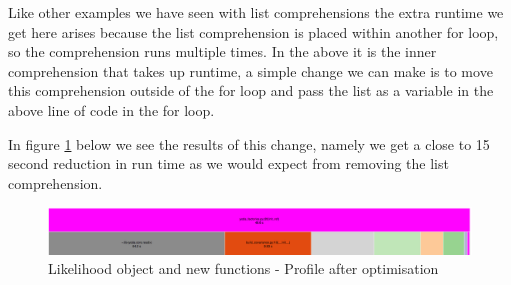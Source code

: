 Like other examples we have seen with list comprehensions the extra runtime we get here arises because the list comprehension is placed within another for loop, so the comprehension runs multiple times. In the above it is the inner comprehension that takes up runtime, a simple change we can make is to move this comprehension outside of the for loop and pass the list as a variable in the above line of code in the for loop.

In figure \ref{fig:comprehension_after} below we see the results of this change, namely we get a close to 15 second reduction in run time as we would expect from removing the list comprehension.

\begin{figure}[H]
\centering
\includegraphics[scale=0.3]{plots/list_comprehension_after.png}
\caption{Likelihood object and new functions - Profile after optimisation}
\label{fig:comprehension_after}
\end{figure}











